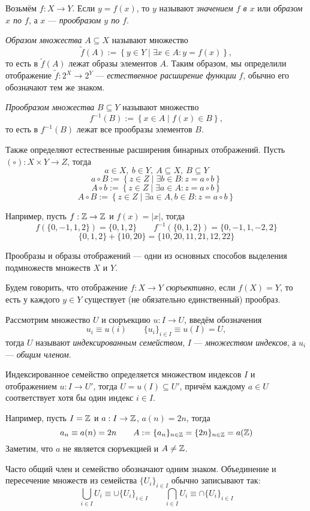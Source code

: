 Возьмём ${f:X\to Y}$. Если ${y=f(x)}$, то $y$ называют {\it значением $f$ в $x$}
или {\it образом $x$ по $f$},
а $x$ --- {\it прообразом $y$ по $f$}.

{\it Образом множества} $A\subseteq X$
называют множество
\[
	\widetilde f(A):=\left\{y\in Y\;\big|\; \exists x\in A:y=f(x)\right\},
\]
то есть в $\widetilde f(A)$ лежат образы элементов $A$. Таким образом, мы определили
отображение $\widetilde f:2^{X}\to 2^{Y}$ ---
{\it естественное расширение функции} $f$, обычно его обозначают
тем же знаком.

{\it Прообразом множества} $B\subseteq Y$ называют множество
\[
	f^{-1}(B):=\left\{x\in A\;\big|\; f(x)\in B\right\},
\]
то есть в $f^{-1}(B)$ лежат все прообразы элементов $B$.

Также определяют естественные расширения бинарных отображений.
Пусть $(\circ):X\times Y\to Z$, тогда
\[
	a\in X,~ b\in Y,~A\subseteq X,~ B\subseteq Y
\]
\[
	a\circ B:=\left\{z\in Z\;\big|\;\exists b\in B:z=a\circ b\right\}
\]
\[
	A\circ b:=\left\{z\in Z\;\big|\;\exists a\in A:z=a\circ b\right\}
\]
\[
	A\circ B:=\left\{z\in Z\;\big|\;\exists a\in A,b\in B:z=a\circ b\right\}
\]

Например, пусть $f:\mathbb Z\to\mathbb Z$ и $f(x)=|x|$, тогда
\[
	f(\{0,-1,1,2\})=\{0,1,2\}\qquad f^{-1}(\{0,1,2\})=\{0,-1,1,-2,2\}
\]
\[
	\{0,1,2\}+\{10,20\}=\{10,20,11,21,12,22\}
\]

Прообразы и образы отображений --- одни из основных способов выделения
подмножеств множеств $X$ и $Y$.

Будем говорить, что отображение $f:X\to Y$ {\it сюръективно}, если $f(X)=Y$,
то есть у каждого $y\in Y$ существует (не обязательно единственный) прообраз.

Рассмотрим множество $U$ и сюръекцию ${u:I\to U}$,
введём обозначения
\[
	u_{i}\equiv u(i)\qquad \{u_{i}\}_{i\in I}\equiv u(I)=U,
\]
тогда $U$ называют {\it индексированным семейством}, $I$ --- {\it множеством индексов},
а $u_{i}$ --- {\it общим членом}.

Индексированное семейство определяется множеством индексов $I$ и отображением
${u:I\to U'}$, тогда $U=u(I)\subseteq U'$,
причём каждому $a\in U$ соответствует хотя бы один индекс $i\in I$.

Например, пусть $I=\mathbb Z$ и $a:I\to \mathbb Z$, $a(n)=2n$, тогда
\[
	a_{n}\equiv a(n)=2n\qquad A:=\{a_{n}\}_{n\in\mathbb Z}=\{2n\}_{n\in\mathbb Z}=a(\mathbb Z)
\]
Заметим, что $a$ не является сюръекцией и $A\neq \mathbb Z$.

Часто общий член и семейство обозначают одним знаком.
Объединение и пересечение множеств из семейства $\{U_{i}\}_{i\in I}$
обычно записывают так:
\[
	\bigcup_{i\in I}U_{i}\equiv\cup \{U_{i}\}_{i\in I}\qquad
	\bigcap_{i\in I}U_{i}\equiv\cap \{U_{i}\}_{i\in I}
\]

